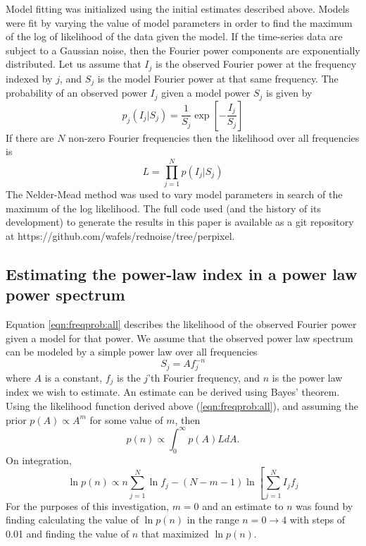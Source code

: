 \documentclass[onecolumn]{emulateapj}
\begin{document}
Model fitting was initialized using the initial estimates described
above.  Models were fit by varying the value of model parameters in
order to find the maximum of the log of likelihood of the data given
the model.  If the time-series data are subject to a Gaussian noise,
then the Fourier power components are exponentially distributed.  Let
us assume that $I_{j}$ is the observed Fourier power at the frequency
indexed by $j$, and $S_{j}$ is the model Fourier power at that same
frequency.  The probability of an observed power $I_{j}$ given a model
power $S_{j}$ is given by
\begin{equation}
p_{j}\left(I_{j}|S_{j}\right) =
\frac{1}{S_{j}}\exp\left[-\frac{I_{j}}{S_{j}}\right]
\label{eqn:freqprob}
\end{equation}
If there are $N$ non-zero Fourier frequencies then the likelihood over
all frequencies is
\begin{equation}
L=\prod_{j=1}^{N}p\left(I_{j}|S_{j}\right)
\label{eqn:freqprob:all}
\end{equation}
The Nelder-Mead method was used to vary model parameters in search of
the maximum of the log likelihood.  The full code used (and the
history of its development) to generate the results in this paper is
available as a git repository at
https://github.com/wafels/rednoise/tree/perpixel.

\subsection{Estimating the power-law index in a power law power
  spectrum}
Equation \ref{eqn:freqprob:all} describes the likelihood of the
observed Fourier power given a model for that power.  We assume that
the observed power law spectrum can be modeled by a simple power law
over all frequencies
\begin{equation}
S_{j} = Af_{j}^{-n}
\end{equation}
where $A$ is a constant, $f_{j}$ is the $j$'th Fourier frequency, and
$n$ is the power law index we wish to estimate.  An estimate can be
derived using Bayes' theorem. Using the likelihood function derived
above (\ref{eqn:freqprob:all}), and assuming the prior $p(A)\propto
A^{m}$ for some value of $m$, then 
\begin{equation}
p(n) \propto \int_{0}^{\infty} p(A) L dA.
\label{eqn:bayes}
\end{equation}
On integration,
\begin{equation}
\ln p(n) \propto n\sum_{j=1}^{N}\ln f_{j} - (N-m-1)\ln\left[\sum_{j=1}^{N}I_{j}f_{j}
\label{eqn:pnlog}
\end{equation}
For the purposes of this investigation, $m=0$ and an estimate to $n$
was found by finding calculating the value of $\ln p(n)$ in the range
$n=0\rightarrow4$ with steps of 0.01 and finding the value of $n$ that
maximized $\ln p(n)$.
\end{document}

